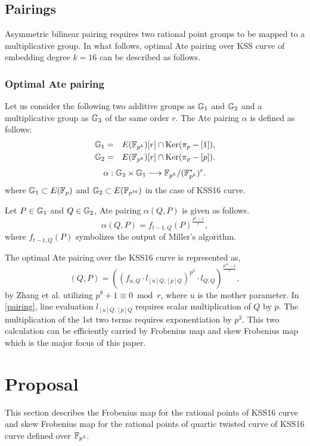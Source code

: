 \subsection{Pairings}
 Asymmetric bilinear pairing requires two rational point groups to be mapped to a multiplicative group.
In what follows,  optimal Ate pairing over KSS curve of embedding degree $k = 16$ can be described as follows.
\subsubsection{Optimal Ate pairing}
Let us consider the following two additive groups as ${\mathbb{G}}_{1}$ and ${\mathbb{G}}_{2}$ and a multiplicative group as ${\mathbb{G}}_{3}$ of the same order $r$. The Ate pairing $\alpha$ is defined as follows:
\begin{eqnarray}
	{\mathbb{G}}_{1}&=&E(\mathbb{F}_{p^k})[r]\cap {\rm Ker}(\pi_p-[1])\nonumber,\\
	{\mathbb{G}}_{2}&=&E(\mathbb{F}_{p^k})[r]\cap {\rm Ker}(\pi_p-[p])\nonumber.
\end{eqnarray}
\begin{eqnarray}
	\alpha:{\mathbb{G}}_{2}\times{\mathbb{G}}_{1}\longrightarrow\mathbb{F}_{p^k}/(\mathbb{F}_{p^k}^*)^r.
\end{eqnarray}
where ${\mathbb{G}}_{1} \subset E(\mathbb{F}_p)$ and ${\mathbb{G}}_{2} \subset E(\mathbb{F}_{p^{16}})$  in the case of KSS16 curve.

Let $P \in {\mathbb{G}}_{1}$ and $Q\in{\mathbb{G}}_{2}$, Ate pairing $\alpha(Q,P)$ is given as follows.
\begin{equation}
	\alpha(Q,P)=f_{t-1,Q}(P)^{\frac{p^k-1}{r}},
\end{equation}
where $f_{t-1,Q}(P)$ symbolizes the output of Miller's algorithm. 

The optimal Ate pairing over the KSS16 curve is represented as,
\begin{equation}
	(Q,P)=((f_{u,Q}\cdot l_{[u]Q,[p]Q})^{p^3}\cdot l_{Q,Q})^{\frac{p^{16}-1}{r}}\label{pairing},
\end{equation}
by  Zhang et al. \cite{kss_zan} utilizing $p^8 +1 \equiv 0 \bmod r$, where $u$ is the mother parameter.
In \eqref{pairing}, line evaluation $l_{[u]Q,[p]Q}$ requires scalar multiplication of $Q$ by $p$. The multiplication of the 1st two terms requires exponentiation by $p^3$. This two calculation can be efficiently carried by Frobenius map and skew Frobenius map which is the major focus of this paper.

\section{Proposal}
This section describes the Frobenius map for the rational points of KSS16 curve and skew Frobenius map for the rational points of quartic twisted curve of KSS16 curve defined over $\mathbb{F}_{p^4}$.

